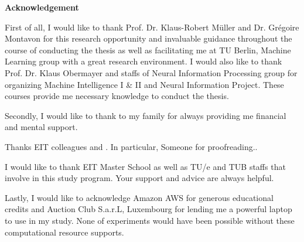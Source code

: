 \thispagestyle{empty}
\vspace*{3cm}
\begin{center}
    \textbf{Acknowledgement}
\end{center}

First of all, I would like to thank Prof. Dr. Klaus-Robert M\"{u}ller and Dr. Gr\'{e}goire Montavon for this research opportunity and invaluable guidance throughout  the course of conducting the thesis as well as facilitating me at TU Berlin, Machine Learning group with a great research environment. I would also like to thank Prof. Dr. Klaus Obermayer and staffs of Neural Information Processing group for organizing Machine Intelligence I \& II and Neural Information Project. These courses provide me necessary knowledge to conduct the thesis.


Secondly, I would like to thank to my family for always providing me financial and mental support. 

Thanks EIT colleagues and . In particular, Someone for proofreading..

I would like to thank EIT Master School as well as TU/e and TUB staffs that involve in this study program.  Your support and advice are always helpful. 

Lastly, I would like to acknowledge Amazon AWS for generous educational credits and Auction Club S.a.r.L, Luxembourg for lending me a powerful laptop to use in my study. None of experiments would have been possible without these computational resource supports.